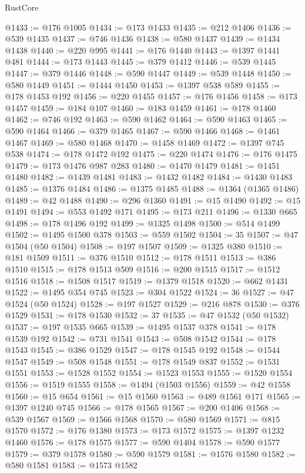\begin{lexlean}{RustCore}
\begin{coremodule}
@1433 := @176 @1005
@1434 := @173 @1433
@1435 := @212 @1406
@1436 := @539 @1435
@1437 := @746 @1436
@1438 := @580 @1437
@1439 := @1434 @1438
@1440 := @220 @995
@1441 := @176 @1440
@1443 := @1397 @1441 @481
@1444 := @173 @1443
@1445 := @379 @1412
@1446 := @539 @1445
@1447 := @379 @1446
@1448 := @590 @1447
@1449 := @539 @1448
@1450 := @580 @1449
@1451 := @1444 @1450
@1453 := @1397 @538 @589
@1455 := @178 @1453 @192
@1456 := @220 @1455
@1457 := @176 @1456
@1458 := @173 @1457
@1459 := @184 @107
@1460 := @183 @1459
@1461 := @178 @1460
@1462 := @746 @192
@1463 := @590 @1462
@1464 := @590 @1463
@1465 := @590 @1464
@1466 := @379 @1465
@1467 := @590 @1466
@1468 := @1461 @1467
@1469 := @580 @1468
@1470 := @1458 @1469
@1472 := @1397 @745 @538
@1474 := @178 @1472 @192
@1475 := @220 @1474
@1476 := @176 @1475
@1479 := @173 @1476 @987 @283
@1480 := @1470 @1479
@1481 := @1451 @1480
@1482 := @1439 @1481
@1483 := @1432 @1482
@1484 := @1430 @1483
@1485 := @1376 @1484
@1486 := @1375 @1485
@1488 := @1364 (@1365 @1486)
@1489 := @42 @1488
@1490 := @296 @1360
@1491 := @15 @1490
@1492 := @15 @1491
@1494 := @553 @1492 @171
@1495 := @173 @211
@1496 := @1330 @665
@1498 := @178 @1496 @192
@1499 := @1325 @1498
@1500 := @514 @1499
@1502 := @1495 @1500 @378
@1503 := @559 @1502
@1504 := 35
@1507 := @47 @1504 (@50 @1504)
@1508 := @197 @1507
@1509 := @1325 @380
@1510 := @181 @1509
@1511 := @376 @1510
@1512 := @178 @1511
@1513 := @386 @1510
@1515 := @178 @1513 @509
@1516 := @200 @1515
@1517 := @1512 @1516
@1518 := @1508 @1517
@1519 := @1379 @1518
@1520 := @662 @1431
@1522 := @1495 @354 @745
@1523 := @304 @1522
@1524 := 36
@1527 := @47 @1524 (@50 @1524)
@1528 := @197 @1527
@1529 := @216 @878
@1530 := @376 @1529
@1531 := @178 @1530
@1532 := 37
@1535 := @47 @1532 (@50 @1532)
@1537 := @197 @1535 @665
@1539 := @1495 @1537 @378
@1541 := @178 @1539 @192
@1542 := @731 @1541
@1543 := @508 @1542
@1544 := @178 @1543
@1545 := @386 @1529
@1547 := @178 @1545 @192
@1548 := @1544 @1547
@1549 := @508 @1548
@1551 := @178 @1549 @837
@1552 := @1531 @1551
@1553 := @1528 @1552
@1554 := @1523 @1553
@1555 := @1520 @1554
@1556 := @1519 @1555
@1558 := @1494 (@1503 @1556)
@1559 := @42 @1558
@1560 := @15 @654
@1561 := @15 @1560
@1563 := @489 @1561 @171
@1565 := @1397 @1240 @745
@1566 := @178 @1565
@1567 := @200 @1406
@1568 := @539 @1567
@1569 := @1566 @1568
@1570 := @580 @1569
@1571 := @815 @1570
@1572 := @176 @1380
@1573 := @173 @1572
@1575 := @1397 @1232 @1460
@1576 := @178 @1575
@1577 := @590 @1404
@1578 := @590 @1577
@1579 := @379 @1578
@1580 := @590 @1579
@1581 := @1576 @1580
@1582 := @580 @1581
@1583 := @1573 @1582

\end{coremodule}
\end{lexlean}
